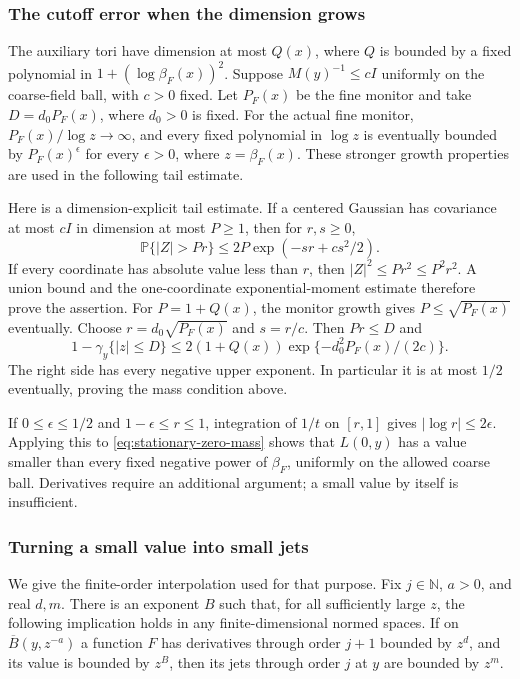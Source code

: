 \subsubsection{The cutoff error when the dimension grows}
The auxiliary tori have dimension at most $Q(x)$, where $Q$ is bounded
by a fixed polynomial in $1+(\log\beta_F(x))^2$. Suppose
$M(y)^{-1}\le cI$ uniformly on the coarse-field ball, with $c>0$
fixed. Let $P_F(x)$ be the fine monitor and take $D=d_0P_F(x)$,
where $d_0>0$ is fixed. For the actual fine monitor,
$P_F(x)/\log z\to\infty$, and every fixed polynomial in $\log z$
is eventually bounded by $P_F(x)^\epsilon$ for every $\epsilon>0$,
where $z=\beta_F(x)$. These stronger growth properties are used
in the following tail estimate.

Here is a dimension-explicit tail estimate. If a centered Gaussian
has covariance at most $cI$ in dimension at most $P\ge1$, then
for $r,s\ge0$,
\[
 \mathbb P\{|Z|>Pr\}\le2P\exp(-sr+cs^2/2).
\]
If every coordinate has absolute value less than $r$, then
$|Z|^2\le Pr^2\le P^2r^2$. A union bound and the one-coordinate
exponential-moment estimate therefore prove the assertion.
For $P=1+Q(x)$, the monitor growth gives $P\le\sqrt{P_F(x)}$
eventually. Choose $r=d_0\sqrt{P_F(x)}$ and $s=r/c$. Then $Pr\le D$
and
\begin{equation}\label{eq:stationary-tail}
 1-\gamma_y\{|z|\le D\}
        \le2(1+Q(x))\exp\{-d_0^2P_F(x)/(2c)\}.
\end{equation}
The right side has every negative upper exponent. In particular it
is at most $1/2$ eventually, proving the mass condition above.

If $0\le\epsilon\le1/2$ and $1-\epsilon\le r\le1$, integration
of $1/t$ on $[r,1]$ gives $|\log r|\le2\epsilon$. Applying this to
\eqref{eq:stationary-zero-mass} shows that $L(0,y)$ has a value
smaller than every fixed negative power of $\beta_F$, uniformly
on the allowed coarse ball. Derivatives require an additional
argument; a small value by itself is insufficient.

\subsubsection{Turning a small value into small jets}
We give the finite-order interpolation used for that purpose. Fix
$j\in\mathbb N$, $a>0$, and real $d,m$. There is an exponent $B$
such that, for all sufficiently large $z$, the following implication
holds in any finite-dimensional normed spaces. If on
$\overline B(y,z^{-a})$ a function $F$ has derivatives through order
$j+1$ bounded by $z^d$, and its value is bounded by $z^B$, then its
jets through order $j$ at $y$ are bounded by $z^m$.

